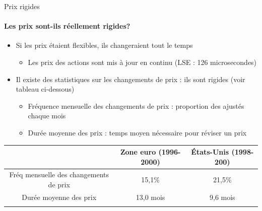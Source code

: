 \documentclass[
  ignorenonframetext,
  aspectratio=169,
]{beamer}
\providecommand{\tightlist}{%
  \setlength{\itemsep}{0pt}\setlength{\parskip}{0pt}}\usepackage{longtable,booktabs,array}
\begin{document}
\begin{frame}{Prix rigides}
\label{prix-rigides-1}
\framesubtitle{Les prix sont-ils réellement rigides?}

\begin{itemize}
\tightlist
\item
  Si les prix étaient flexibles, ils changeraient tout le temps

  \begin{itemize}
  \tightlist
  \item
    Les prix des actions sont mis à jour en continu (LSE : 126
    microsecondes)
  \end{itemize}
\item
  Il existe des statistiques sur les changements de prix : ils sont
  rigides (voir tableau ci-dessous)

  \begin{itemize}
  \tightlist
  \item
    Fréquence mensuelle des changements de prix : proportion des ajustés
    chaque mois
  \item
    Durée moyenne des prix : temps moyen nécessaire pour réviser un prix
  \end{itemize}
\end{itemize}

\begin{longtable}[]{@{}ccc@{}}
\toprule\noalign{}
& Zone euro (1996-2000) & États-Unis (1998-200) \\
\midrule\noalign{}
\endhead
Fréq mensuelle des changements de prix & 15,1\% & 21,5\% \\
Durée moyenne des prix & 13,0 mois & 9,6 mois \\
\bottomrule\noalign{}
\end{longtable}
\end{frame}
\end{document}
